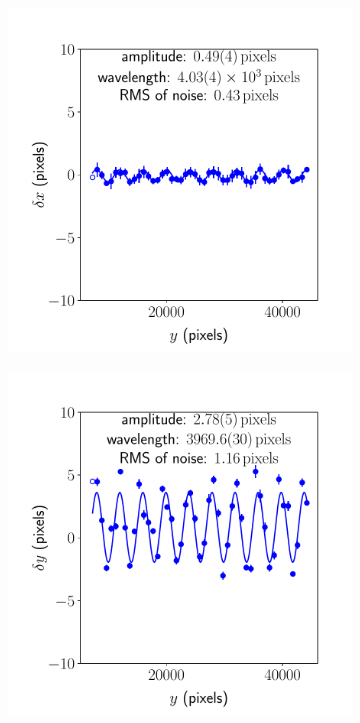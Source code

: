 \documentclass{article}
\begin{document}
\begin{figure}[ht]
\begin{subfigure}{0.24\linewidth}
		\caption{}
		\label{fig:sinewave2yx1}
	\end{subfigure}
	\begin{subfigure}{0.24\linewidth}
		\includegraphics[width=\linewidth]{sine-wave-2-xy-1.pdf}
		\caption{}
		\label{fig:sinewave2xy1}
	\end{subfigure}
	\begin{subfigure}{0.24\linewidth}
		\includegraphics[width=\linewidth]{sine-wave-2-yy-1.pdf}

\end{subfigure}
\end{figure}
\end{document}
